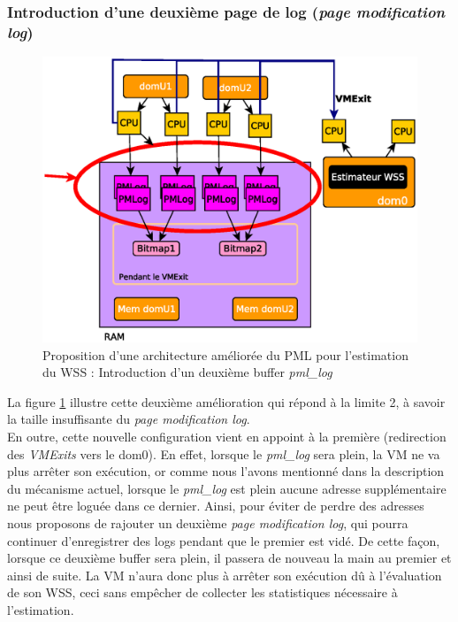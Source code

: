 \subsubsection{Introduction d'une deuxième page de log (\textit{page modification log})}
\begin{figure}[htp]
    \centering
    \includegraphics[scale=.8]{chapters/3/fig3/PMLOverview2}
    \caption{Proposition d'une architecture améliorée du PML pour l'estimation du WSS : Introduction d'un deuxième buffer \textit{pml\_log}}
    \label{fig:double_log}
\end{figure}
La figure \ref{fig:double_log} illustre cette deuxième amélioration qui répond à la limite 2, à savoir la taille insuffisante du \textit{page modification log}.\\
En outre, cette nouvelle configuration vient en appoint à la première (redirection des \textit{VMExits} vers le dom0). En effet, lorsque le \textit{pml\_log} sera plein, la VM ne va plus arrêter son exécution, or comme nous l'avons mentionné dans la description du mécanisme actuel, lorsque le \textit{pml\_log} est plein aucune adresse supplémentaire ne peut être loguée dans ce dernier. Ainsi, pour éviter de perdre des adresses nous proposons de rajouter un deuxième \textit{page modification log}, qui pourra continuer d'enregistrer des logs pendant que le premier est vidé. De cette façon, lorsque ce deuxième buffer sera plein, il passera de nouveau la main au premier et ainsi de suite. La VM n'aura donc plus à arrêter son exécution dû à l'évaluation de son WSS, ceci sans empêcher de collecter les statistiques nécessaire à l'estimation.

